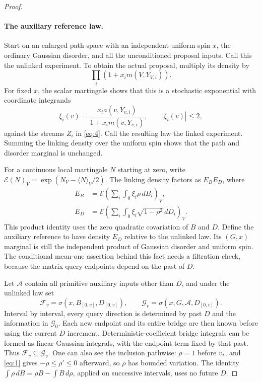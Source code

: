 \begin{proof}
\paragraph{The auxiliary reference law.}
Start on an enlarged path space with an independent uniform spin $x$,
the ordinary Gaussian disorder, and all the unconditioned proposal
inputs. Call this the unlinked experiment. To obtain the actual
proposal, multiply its density by
\[
 \prod_i(1+x_i m(V,Y_{V,i})).
\]
For fixed $x$, the scalar martingale shows that this is a stochastic
exponential with coordinate integrands
\[
 \xi_i(v)=\frac{x_i a(v,Y_{v,i})}{1+x_i m(v,Y_{v,i})},
 \qquad |\xi_i(v)|\le2,
\]
against the streams $Z_i$ in \eqref{eq:4}. Call the resulting law the
linked experiment. Summing the linking density over the uniform spin
shows that the path and disorder marginal is unchanged.

For a continuous local martingale $N$ starting at zero, write
$\mathcal E(N)_V=\exp(N_V-\langle N\rangle_V/2)$.
The linking density factors as $E_BE_D$, where
\[
 \begin{aligned}
 E_B&=\mathcal E\left(\sum_i\int_0^{\cdot}
                  \xi_i\rho\,dB_i\right)_V,\\
 E_D&=\mathcal E\left(\sum_i\int_0^{\cdot}
                  \xi_i\sqrt{1-\rho^2}\,dD_i\right)_V.
 \end{aligned}
\]
This product identity uses the zero quadratic covariation of $B$ and
$D$. Define the auxiliary reference to have density $E_D$ relative
to the unlinked law. Its $(G,x)$ marginal is still the independent product
of Gaussian disorder and uniform spin. The conditional mean-one
assertion behind this fact needs a filtration check, because the
matrix-query endpoints depend on the past of $D$.

Let $\mathcal A$ contain all primitive auxiliary inputs other than
$D$, and under the unlinked law set
\[
 \mathcal F_v=\sigma(x,B_{[0,v]},D_{[0,v]}),\qquad
 \mathcal G_v=\sigma(x,G,\mathcal A,D_{[0,v]}).
\]
Interval by interval, every query direction is determined by past
$D$ and the information in $\mathcal G_0$. Each new endpoint and
its entire bridge are then known before using the current $D$
increment. Deterministic-coefficient bridge integrals can be formed as
linear Gaussian integrals, with the endpoint term fixed by that past.
Thus $\mathcal F_v\subseteq\mathcal G_v$.
One can also see the inclusion pathwise: $\rho=1$ before $v_*$, and
\eqref{eq:1} gives $-\rho\le\rho'\le0$ afterward, so $\rho$ has
bounded variation. The identity
$\int\rho\,dB=\rho B-\int B\,d\rho$, applied on successive
intervals, uses no future $D$.


\end{proof}
